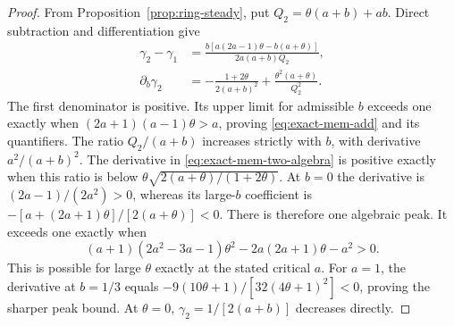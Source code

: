 \begin{proof}
From Proposition~\ref{prop:ring-steady}, put
$Q_2=\theta(a+b)+ab$. Direct subtraction and differentiation give
\begin{equation}
\begin{split}
 \gamma_2-\gamma_1
 &=\frac{b[a(2a-1)\theta-b(a+\theta)]}{2a(a+b)Q_2},\\
 \partial_b\gamma_2
 &=-\frac{1+2\theta}{2(a+b)^2}
   +\frac{\theta^2(a+\theta)}{Q_2^2}.
 \label{eq:exact-mem-two-algebra}
\end{split}
\end{equation}
The first denominator is positive. Its upper limit for admissible
$b$ exceeds one exactly when $(2a+1)(a-1)\theta>a$, proving
\eqref{eq:exact-mem-add} and its quantifiers.
The ratio $Q_2/(a+b)$ increases strictly with $b$, with derivative
$a^2/(a+b)^2$. The derivative in \eqref{eq:exact-mem-two-algebra}
is positive exactly when this ratio is below
$\theta\sqrt{2(a+\theta)/(1+2\theta)}$.
At $b=0$ the derivative is $(2a-1)/(2a^2)>0$, whereas its large-$b$
coefficient is $-[a+(2a+1)\theta]/[2(a+\theta)]<0$.
There is therefore one algebraic peak. It exceeds one exactly when
\begin{equation}
 (a+1)(2a^2-3a-1)\theta^2
       -2a(2a+1)\theta-a^2>0.
 \label{eq:exact-mem-two-boundary}
\end{equation}
This is possible for large $\theta$ exactly at the stated critical $a$.
For $a=1$, the derivative at $b=1/3$ equals
$-9(10\theta+1)/[32(4\theta+1)^2]<0$, proving the sharper peak bound.
At $\theta=0$, $\gamma_2=1/[2(a+b)]$ decreases directly.


\end{proof}
